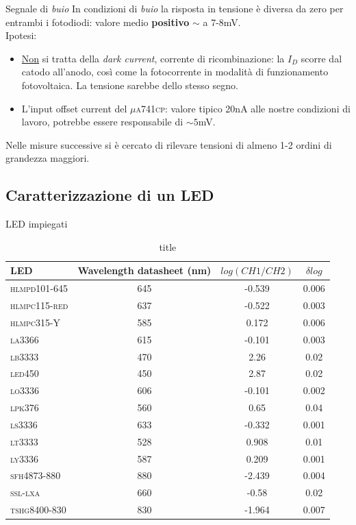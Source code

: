 \documentclass{beamer}
\begin{document}
\begin{frame}{Segnale di \textit{buio}}
In condizioni di \textit{buio} la risposta in tensione è diversa da zero per entrambi i fotodiodi: valore medio \textbf{positivo} $\sim$ a 7-8mV.\\
Ipotesi:
\begin{itemize}
\item \underline{Non} si tratta della \textit{dark current}, corrente di ricombinazione: la $I_D$ scorre dal catodo all'anodo, così come la fotocorrente in modalità di funzionamento fotovoltaica. La tensione sarebbe dello stesso segno.

\item L'input offset current del \textsc{$\mu$a741cp}: valore tipico  20nA alle nostre condizioni di lavoro, potrebbe essere responsabile di $\sim 5$mV.
\end{itemize}

Nelle misure successive si è cercato di rilevare tensioni di almeno 1-2 ordini di grandezza maggiori.
\end{frame}

\subsection{Caratterizzazione di un LED}
\begin{frame}{LED impiegati}
\begin{table}[h]
\centering
\fontsize{10}{12}
\begin{tabular}{l|c|c|c}
\hline
\textbf{LED} & \textbf{Wavelength} datasheet (nm) & $log(CH1/CH2)$ & $\delta log$ \\
\hline
\textsc{hlmpd101-645} & 645 & -0.539 & 0.006 \\
\textsc{hlmpc115-red} & 637 & -0.522 & 0.003 \\
\textsc{hlmpc315-Y} & 585 & 0.172 & 0.006 \\
\textsc{la3366} & 615 & -0.101 & 0.003 \\
\textsc{lb3333} & 470 & 2.26 & 0.02 \\
\textsc{led450} & 450 & 2.87 & 0.02 \\
\textsc{lo3336} & 606 & -0.101 & 0.002 \\
\textsc{lpk376} & 560 & 0.65 & 0.04 \\
\textsc{ls3336} & 633 & -0.332 & 0.001 \\
\textsc{lt3333} & 528 & 0.908 & 0.01 \\
\textsc{ly3336} & 587 & 0.209 & 0.001 \\
\textsc{sfh4873-880} & 880 & -2.439 & 0.004 \\
\textsc{ssl-lxa} & 660 & -0.58 & 0.02 \\
\textsc{tshg8400-830} & 830 & -1.964 & 0.007 \\
\hline
\end{tabular}
\caption{title}
\label{tabella_LED}
\end{table}
\end{frame}
\end{document}
